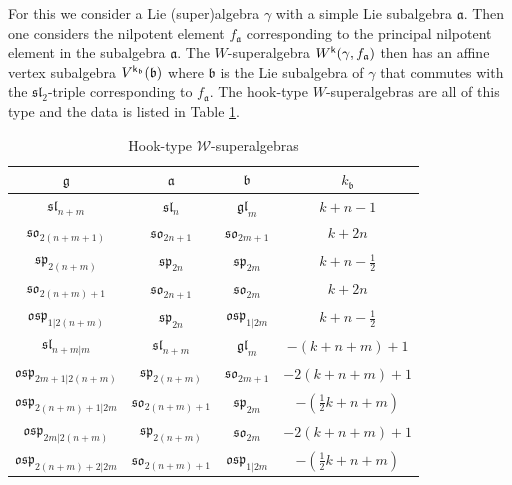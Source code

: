 \documentclass[a4paper, reqno]{amsart}
\theoremstyle{introTheorems}
\newcommand\g\gamma
\renewcommand{\1}{\mathbbold{1}}
\begin{document}
For this we consider a Lie (super)algebra $\g$ with a simple Lie subalgebra $\mathfrak a$. Then one considers the nilpotent element $f_{\mathfrak a}$ corresponding to the principal nilpotent element in the subalgebra $\mathfrak a$. The $W$-superalgebra $W^\k(\g, f_{\mathfrak a})$ then has an affine vertex subalgebra $V^{\mathsf{k}_{\mathfrak b}}(\mathfrak b)$ where $\mathfrak b$ is the Lie subalgebra of $\g$ that commutes with the $\mathfrak{sl}_2$-triple corresponding to $f_{\mathfrak a}$. The hook-type $W$-superalgebras are all of this type and the data is listed in Table 
\ref{tab:hook-type}.

\begin{table}[h]
\centering
\begin{tabular}{|c|c|c|c|}
\hline 
 $\mathfrak{g}$ & $\mathfrak{a}$ & $\mathfrak{b}$ & $k_{\mathfrak{b}}$ \\ \hline 
 $\mathfrak{sl}_{n+m}$            & $\mathfrak{sl}_n$      & $\mathfrak{gl}_m$        & $k+n-1$ \\ 
 $\mathfrak{so}_{2(n+m+1)}$        & $\mathfrak{so}_{2n+1}$ & $\mathfrak{so}_{2m+1}$   & $k+2n$ \\
 $\mathfrak{sp}_{2(n+m)}$          & $\mathfrak{sp}_{2n}$   & $\mathfrak{sp}_{2m}$     & $k+n-\tfrac{1}{2}$ \\
 $\mathfrak{so}_{2(n+m)+1}$        & $\mathfrak{so}_{2n+1}$ & $\mathfrak{so}_{2m}$     & $k+2n$ \\
 $\mathfrak{osp}_{1|2(n+m)}$       & $\mathfrak{sp}_{2n}$   & $\mathfrak{osp}_{1|2m}$  & $k+n-\tfrac{1}{2}$ \\
 $\mathfrak{sl}_{n+m|m}$           & $\mathfrak{sl}_{n+m}$          & $\mathfrak{gl}_m$      & $-(k+n+m)+1$ \\
 $\mathfrak{osp}_{2m+1|2(n+m)}$    & $\mathfrak{sp}_{2(n+m)}$       & $\mathfrak{so}_{2m+1}$ & $-2(k+n+m)+1$ \\
 $\mathfrak{osp}_{2(n+m)+1|2m}$    & $\mathfrak{so}_{2(n+m)+1}$     & $\mathfrak{sp}_{2m}$   & $-(\tfrac{1}{2}k+n+m)$ \\
 $\mathfrak{osp}_{2m|2(n+m)}$      & $\mathfrak{sp}_{2(n+m)}$       & $\mathfrak{so}_{2m}$   & $-2(k+n+m)+1$ \\
 $\mathfrak{osp}_{2(n+m)+2|2m}$    & $\mathfrak{so}_{2(n+m)+1}$     & $\mathfrak{osp}_{1|2m}$ & $-(\tfrac{1}{2}k+n+m)$ \\
\hline 
\end{tabular}
\caption{Hook-type $\mathcal{W}$-superalgebras}
\label{tab:hook-type}
\end{table}
\end{document}

